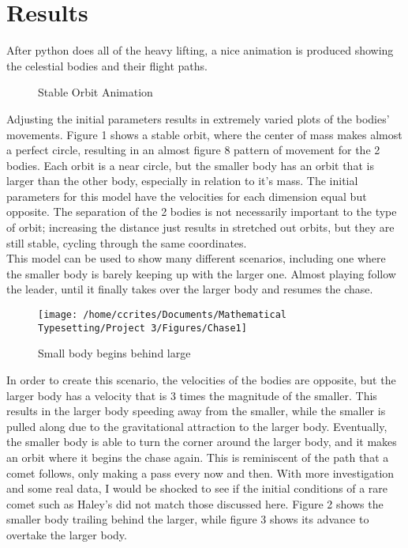 \documentclass[10pt]{article}
\begin{document}
\section{Results}\label{Sec_Results}
After python does all of the heavy lifting, a nice animation is produced showing the celestial bodies and their flight paths.\\
\par
\begin{wrapfigure}{l}{0.45\textwidth}
\caption{\label{fig1} Stable Orbit Animation}
\end{wrapfigure}
Adjusting the initial parameters results in extremely varied plots of the bodies' movements. Figure 1 shows a stable orbit, where the center of mass makes almost a perfect circle, resulting in an almost figure 8 pattern of movement for the 2 bodies. Each orbit is a near circle, but the smaller body has an orbit that is larger than the other body, especially in relation to it's mass. The initial parameters for this model have the velocities for each dimension equal but opposite. The separation of the 2 bodies is not necessarily important to the type of orbit; increasing the distance just results in stretched out orbits, but they are still stable, cycling through the same coordinates.\\
This model can be used to show many different scenarios, including one where the smaller body is barely keeping up with the larger one. Almost playing follow the leader, until it finally takes over the larger body and resumes the chase.\\
\par
\begin{wrapfigure}{l}{0.45\textwidth}
\texttt{[image: /home/ccrites/Documents/Mathematical Typesetting/Project 3/Figures/Chase1]}
\caption{\label{fig2} Small body begins behind large}
\end{wrapfigure}
In order to create this scenario, the velocities of the bodies are opposite, but the larger body has a velocity that is 3 times the magnitude of the smaller. This results in the larger body speeding away from the smaller, while the smaller is pulled along due to the gravitational attraction to the larger body. Eventually, the smaller body is able to turn the corner around the larger body, and it makes an orbit where it begins the chase again. This is reminiscent of the path that a comet follows, only making a pass every now and then. With more investigation and some real data, I would be shocked to see if the initial conditions of a rare comet such as Haley's did not match those discussed here. Figure 2 shows the smaller body trailing behind the larger, while figure 3 shows its advance to overtake the larger body.
\end{document}
